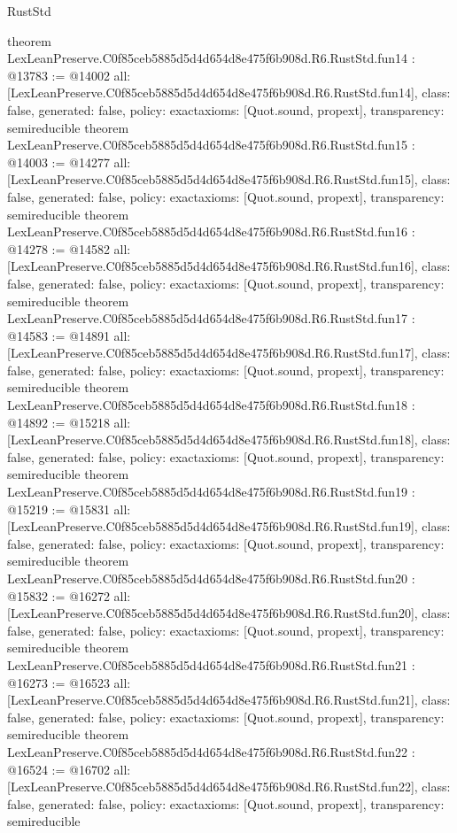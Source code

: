 \begin{lexlean}{RustStd}
\begin{coremodule}
{}
theorem LexLeanPreserve.C0f85ceb5885d5d4d654d8e475f6b908d.R6.RustStd.fun14 : @13783 := @14002 {
  all: [LexLeanPreserve.C0f85ceb5885d5d4d654d8e475f6b908d.R6.RustStd.fun14],
  class: false,
  generated: false,
  policy: exact{axioms: [Quot.sound, propext]},
  transparency: semireducible
}
theorem LexLeanPreserve.C0f85ceb5885d5d4d654d8e475f6b908d.R6.RustStd.fun15 : @14003 := @14277 {
  all: [LexLeanPreserve.C0f85ceb5885d5d4d654d8e475f6b908d.R6.RustStd.fun15],
  class: false,
  generated: false,
  policy: exact{axioms: [Quot.sound, propext]},
  transparency: semireducible
}
theorem LexLeanPreserve.C0f85ceb5885d5d4d654d8e475f6b908d.R6.RustStd.fun16 : @14278 := @14582 {
  all: [LexLeanPreserve.C0f85ceb5885d5d4d654d8e475f6b908d.R6.RustStd.fun16],
  class: false,
  generated: false,
  policy: exact{axioms: [Quot.sound, propext]},
  transparency: semireducible
}
theorem LexLeanPreserve.C0f85ceb5885d5d4d654d8e475f6b908d.R6.RustStd.fun17 : @14583 := @14891 {
  all: [LexLeanPreserve.C0f85ceb5885d5d4d654d8e475f6b908d.R6.RustStd.fun17],
  class: false,
  generated: false,
  policy: exact{axioms: [Quot.sound, propext]},
  transparency: semireducible
}
theorem LexLeanPreserve.C0f85ceb5885d5d4d654d8e475f6b908d.R6.RustStd.fun18 : @14892 := @15218 {
  all: [LexLeanPreserve.C0f85ceb5885d5d4d654d8e475f6b908d.R6.RustStd.fun18],
  class: false,
  generated: false,
  policy: exact{axioms: [Quot.sound, propext]},
  transparency: semireducible
}
theorem LexLeanPreserve.C0f85ceb5885d5d4d654d8e475f6b908d.R6.RustStd.fun19 : @15219 := @15831 {
  all: [LexLeanPreserve.C0f85ceb5885d5d4d654d8e475f6b908d.R6.RustStd.fun19],
  class: false,
  generated: false,
  policy: exact{axioms: [Quot.sound, propext]},
  transparency: semireducible
}
theorem LexLeanPreserve.C0f85ceb5885d5d4d654d8e475f6b908d.R6.RustStd.fun20 : @15832 := @16272 {
  all: [LexLeanPreserve.C0f85ceb5885d5d4d654d8e475f6b908d.R6.RustStd.fun20],
  class: false,
  generated: false,
  policy: exact{axioms: [Quot.sound, propext]},
  transparency: semireducible
}
theorem LexLeanPreserve.C0f85ceb5885d5d4d654d8e475f6b908d.R6.RustStd.fun21 : @16273 := @16523 {
  all: [LexLeanPreserve.C0f85ceb5885d5d4d654d8e475f6b908d.R6.RustStd.fun21],
  class: false,
  generated: false,
  policy: exact{axioms: [Quot.sound, propext]},
  transparency: semireducible
}
theorem LexLeanPreserve.C0f85ceb5885d5d4d654d8e475f6b908d.R6.RustStd.fun22 : @16524 := @16702 {
  all: [LexLeanPreserve.C0f85ceb5885d5d4d654d8e475f6b908d.R6.RustStd.fun22],
  class: false,
  generated: false,
  policy: exact{axioms: [Quot.sound, propext]},
  transparency: semireducible
}
\end{coremodule}
\end{lexlean}
